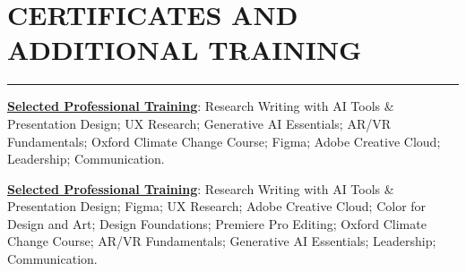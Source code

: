 \documentclass[10pt,letterpaper]{article}
\newcommand{\weblink}[2]{\href{#1}{\textbf{#2}}}
\newcommand{\sectionrule}{\par\vspace{-2pt}\noindent\rule{\linewidth}{0.4pt}\par\vspace{2pt}}
\newcommand{\body}[1]{{\setlength{\rightskip}{2.7em}#1\par}}
\newenvironment{spread}[2][\normalsize]{\par\begingroup\linespread{#2}#1\selectfont}{\par\endgroup}
\begin{document}
\begin{spread}{1.03}
\begin{spread}{1.07}
\section{\MakeUppercase{Certificates and Additional Training}}
\sectionrule

\ifdefined\EDRES
\body{\small\weblink{https://linkedin.com/in/hiamritaa}{Selected Professional Training}: Research Writing with AI Tools \& Presentation Design; UX Research; Generative AI Essentials; AR/VR Fundamentals; Oxford Climate Change Course; Figma; Adobe Creative Cloud; Leadership; Communication.}
\else
\body{\small\weblink{https://linkedin.com/in/hiamritaa}{Selected Professional Training}: Research Writing with AI Tools \& Presentation Design; Figma; UX Research; Adobe Creative Cloud; Color for Design and Art; Design Foundations; Premiere Pro Editing; Oxford Climate Change Course; AR/VR Fundamentals; Generative AI Essentials; Leadership; Communication.}
\fi

\end{spread}
\end{document}
